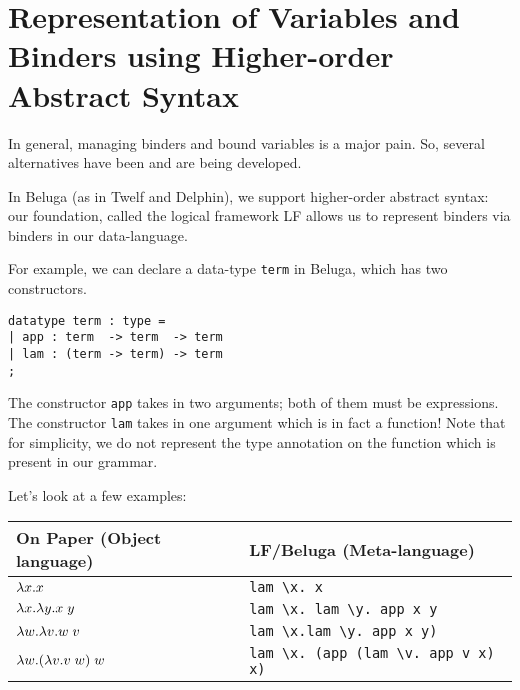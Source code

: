 \section{Representation of Variables and Binders using Higher-order Abstract Syntax}
In general, managing binders and bound variables is a major pain. So,
several alternatives have been and are being developed.

In Beluga (as in Twelf and Delphin), we support higher-order abstract
syntax: our foundation, called the logical framework LF
\cite{Harper93jacm} allows us to represent binders via binders in our
data-language.

For example, we can declare a data-type \lstinline!term! in Beluga,
which has two constructors.

\begin{lstlisting}
datatype term : type =
| app : term  -> term  -> term
| lam : (term -> term) -> term
;
\end{lstlisting}

The constructor \lstinline!app! takes in two arguments; both of them
must be expressions. The constructor \lstinline!lam! takes in one
argument which is in fact a function! Note that for simplicity, we do
not represent the type annotation on the function which is present in
our grammar.

Let's look at a few examples:
\begin{center}
\begin{tabular}{l@{\quad}|@{\quad}l}
  On Paper (Object language) & LF/Beluga (Meta-language)\\
  \hline
  $\lambda x.x$ & \lstinline!lam \x. x! \\
  $\lambda x.\lambda y. x \; y$ &
  \lstinline!lam \x. lam \y. app x y! \\
  $\lambda w.\lambda v. w \; v$ &
  \lstinline!lam \x.lam \y. app x y)! \\
  $\lambda w. (\lambda v. v \; w) \; w$
  & \lstinline!lam \x. (app (lam \v. app v x) x)!
\end{tabular}
\end{center}

